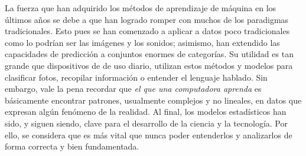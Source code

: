 \documentclass[../Main/Main.tex]{subfiles}
\begin{document}
La fuerza que han adquirido los métodos de aprendizaje de máquina en los últimos años se debe a que han logrado romper con muchos de los paradigmas tradicionales. Esto pues se han comenzado a aplicar a datos poco tradicionales como lo podrían ser las imágenes y los sonidos; asimismo, han extendido las capacidades de predicción a conjuntos enormes de categorías. Su utilidad es tan grande que dispositivos de de uso diario, utilizan estos métodos y modelos para clasificar fotos, recopilar información o entender el lenguaje hablado. Sin embargo, vale la pena recordar que \textit{el que una computadora aprenda} es básicamente encontrar patrones, usualmente complejos y no lineales, en datos que expresan algún fenómeno de la realidad. Al final, los modelos estadísticos han sido, y siguen siendo, clave para el desarrollo de la ciencia y la tecnología. Por ello, se considera que es más vital que nunca poder entenderlos y analizarlos de forma correcta y bien fundamentada. 
\end{document}

